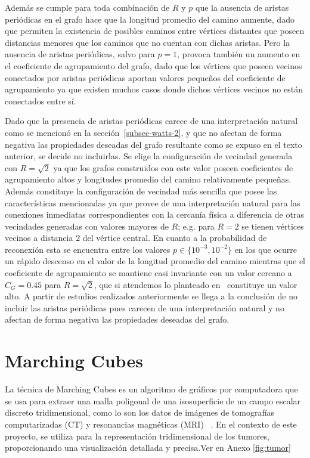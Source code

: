 Adem\'as se cumple para toda combinaci\'on de $R$ y $p$ que la ausencia de aristas peri\'odicas en el grafo hace que la longitud promedio del camino aumente, dado que permiten la existencia de posibles caminos entre v\'ertices distantes que poseen distancias menores que los caminos que no cuentan con dichas aristas. Pero la ausencia de aristas peri\'odicas, salvo para $p=1$, provoca tambi\'en un aumento en el coeficiente de agrupamiento del grafo, dado que los v\'ertices que poseen vecinos conectados por aristas peri\'odicas aportan valores peque\~nos del coeficiente de agrupamiento ya que existen muchos casos donde dichos v\'ertices vecinos no est\'an conectados entre s\'i.

Dado que la presencia de aristas peri\'odicas carece de una interpretaci\'on natural como se mencion\'o en la secci\'on~\ref{subsec-watts-2}, y que no afectan de forma negativa las propiedades deseadas del grafo resultante como se expuso en el texto anterior, se decide no incluirlas. Se elige la configuraci\'on de vecindad generada con $R=\sqrt{2}$ ya que los grafos construidos con este valor poseen coeficientes de agrupamiento altos y longitudes promedio del camino relativamente peque\~nas. Adem\'as constituye la configuraci\'on de vecindad m\'as sencilla que posee las caracter\'isticas mencionadas ya que provee de una interpretaci\'on natural para las conexiones inmediatas correspondientes con la cercan\'ia f\'isica a diferencia de otras vecindades generadas con valores mayores de $R$; e.g. para $R=2$ se tienen v\'ertices vecinos a distancia $2$ del v\'ertice central. En cuanto a la probabilidad de reconexi\'on esta se encuentra entre los valores $p \in \lbrace 10^{-3}, 10^{-2} \rbrace$ en los que ocurre un r\'apido descenso en el valor de la longitud promedio del camino mientras que el coeficiente de agrupamiento se mantiene casi invariante con un valor cercano a $C_G=0$.$45$ para $R=\sqrt{2}$, que si atendemos lo planteado en~\cite{complexnetworks} constituye un valor alto.
A partir de estudios realizados anteriormente \cite{viabarre2019} se llega a la conclusión de no incluir las aristas periódicas pues carecen de una interpretación natural y no afectan de forma negativa las propiedades deseadas del grafo. %

\section{Marching Cubes}

La técnica de Marching Cubes es un algoritmo de gráficos por computadora que se usa para extraer una malla poligonal de una isosuperficie de un campo escalar discreto tridimensional, como lo son los datos de imágenes de tomografías computarizadas (CT) y resonancias magnéticas (MRI) ~\cite{lorensen1987}. En el contexto de este proyecto, se utiliza para la representación tridimensional de los tumores, proporcionando una visualización detallada y precisa.Ver en Anexo \ref{fig:tumor}

